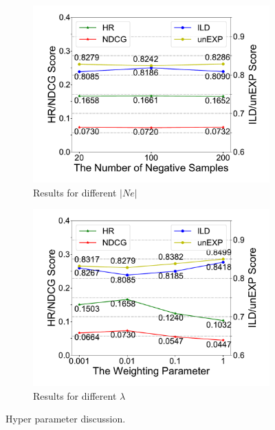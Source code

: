 \begin{figure}[th]
  \begin{subfigure}{0.49\columnwidth}
  \centering
  \includegraphics[width=\columnwidth]{fig/parameter_a.pdf}
  \caption{Results for different $|Ne|$}
  \label{fig:para_a}
  \end{subfigure}
  \begin{subfigure}{0.49\columnwidth}
  \centering
  \includegraphics[width=\columnwidth]{fig/parameter_b.pdf}
  \caption{Results for different $\lambda$}
  \label{fig:para_b}
  \end{subfigure}
  \caption{Hyper parameter discussion.}
\end{figure}

